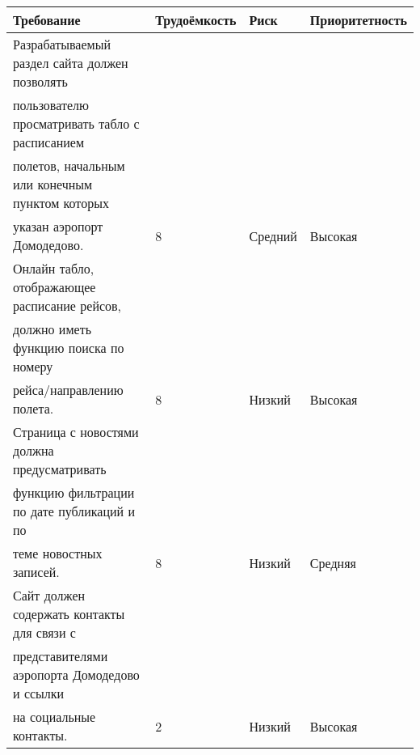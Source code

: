 
\begin{table}[h!]
    \begin{tabular}{|l|l|l|l|}
    \hline
    Требование                                                                                                                                                                                                                                                                                                                                        & Трудоёмкость & Риск    & Приоритетность \\ \hline
    Разрабатываемый раздел сайта должен позволять\\            пользователю просматривать табло с расписанием\\            полетов, начальным или конечным пунктом которых\\            указан аэропорт Домодедово.                                                                                                                                   & 8            & Средний & Высокая        \\ \hline
    Онлайн табло, отображающее расписание рейсов,\\            должно иметь функцию поиска по номеру\\            рейса/направлению полета.                                                                                                                                                                                                           & 8            & Низкий  & Высокая        \\ \hline
    Страница с новостями должна предусматривать\\            функцию фильтрации по дате публикаций и по\\            теме новостных записей.                                                                                                                                                                                                          & 8            & Низкий  & Средняя        \\ \hline
    Сайт должен содержать контакты для связи с\\            представителями аэропорта Домодедово и ссылки\\            на социальные контакты.                                                                                                                                                                                                        & 2            & Низкий  & Высокая        \\ \hline

\end{tabular}
\end{table}
